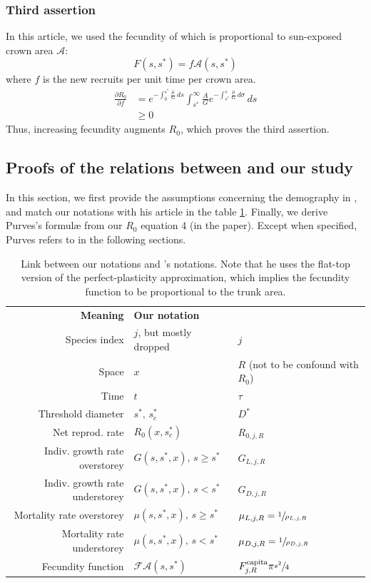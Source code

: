 \documentclass[letterpaper, 12pt]{article}
\newcommand {\s}{{s}^{*}}
\newcommand {\A}{\mathscr{A}}
\newcommand{\F}{\mathcal{F}}
\theoremstyle{theo}
\begin{document}
\begin{refsection}
\begin{onehalfspace}
\subsubsection{Third assertion}
In this article, we used the fecundity of \citet{Purves2008} which is proportional to sun-exposed crown area $ \A $:
\[
	F(s, \s) = f \A(s, \s)
\]
where $ f $ is the new recruits per unit time per crown area.
\begin{align*}
	\frac{\partial R_0}{\partial f} &= e^{-\int_0^{\s} \frac{\mu}{G} \, ds} \int_{\s}^{\infty} \frac{A}{G} e^{-\int_{\s}^{s} \frac{\mu}{G} \, d \sigma} \, ds \\
		&\geqslant 0
\end{align*}
Thus, increasing fecundity augments $ R_0 $, which proves the third assertion.

\subsection{Proofs of the relations between \citet{Purves2009} and our study}
In this section, we first provide the assumptions concerning the demography in \citet{Purves2009}, and match our notations with his article in the table \ref{tab::notations_purves2009}. Finally, we derive Purves's formul\ae{} from our $ R_0 $ equation 4 (in the paper). Except when specified, Purves refers to \citet{Purves2009} in the following sections.
\begin{table}[!h]
	\centering
	\caption[Link between our notations and Purves's notations]{Link between our notations and \citet{Purves2009}'s notations. Note that he uses the flat-top version of the perfect-plasticity approximation, which implies the fecundity function to be proportional to the trunk area.}
	\label{tab::notations_purves2009}
	\begin{tabular}{@{}rll@{}}
	\toprule
	\textbf{Meaning} & \textbf{Our notation} & \textbf{\citet{Purves2009}} \\
	Species index & $ j $, but mostly dropped & $ j $ \\
	Space & $ x $ & $ R $ (not to be confound with $ R_0 $) \\
	Time & $ t $ & $ \tau $ \\
	Threshold diameter & $ \s, \, \s_c $ & $ D^{*} $ \\
	Net reprod. rate & $ R_0 (x, \s_c) $ & $ R_{0, j, R} $ \\
	Indiv. growth rate overstorey & $ G(s, \s, x), \, s \geqslant \s $ & $ G_{L, j, R} $ \\
	Indiv. growth rate understorey & $ G(s, \s, x), \, s < \s $ & $ G_{D, j, R} $ \\
	Mortality rate overstorey & $ \mu(s, \s, x), \, s \geqslant \s $ & $ \mu_{L, j, R} = \sfrac{1}{\rho_{L, j, R}} $ \\
	Mortality rate understorey & $ \mu(s, \s, x), \, s < \s $ & $ \mu_{D, j, R} = \sfrac{1}{\rho_{D, j, R}} $ \\
	Fecundity function & $ \F \A(s, \s) $ & $ F_{j, R}^{\text{capita}} \pi \sfrac{s^2}{4} $ \\
   \bottomrule
	\end{tabular}
\end{table}


\end{onehalfspace}
\end{refsection}
\end{document}
